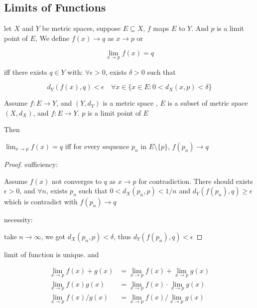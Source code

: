 \subsection{Limits of Functions}

\begin{definition}
    let $X$ and $Y$ be metric spaces, suppose $E \subseteq X$, $f$ maps $E$ to $Y$. 
    And $p$ is a limit point of $E$, We define $f(x) \to q$ as $x \to p$ or

    \[
        \lim_{x \to p}f(x) = q
    \]

    iff there exists $q \in Y$ with: $\forall \epsilon > 0$, exists $\delta > 0$ such that

    \[
        d_Y(f(x), q) < \epsilon \quad \forall x \in  \{x \in E: 0 < d_X(x,p) < \delta \}
    \]
\end{definition}


\begin{thm}
    \label{thm:limit-of-func-iff-limit-of-every-mapping-of-convergent-seq}
    Assume $f: E \to Y$, and $(Y, d_Y)$ is a metric space , $E$ is a subset of metric space $(X, d_X)$, and $f: E\to Y$. 
    $p$ is a limit point of $E$

    Then

    $\lim_{x \to p}f(x) = q$ iff for every sequence $p_n$ in $E \setminus \{p\}$, $f(p_n) \to q$  
\end{thm}

\begin{proof}
   sufficiency: 
   
   Assume $f(x)$ not converges to $q$ as $x \to p$ for contradiction. There should exists $\epsilon > 0$,
    and $\forall n$, exists $p_n$ such that $0 < d_X(p_n, p) < 1/n$ and $d_Y(f(p_n), q) \ge \epsilon$
    which is contradict with $f(p_n) \to q$

    necessity:

    take $n \to \infty$, we got $d_X(p_n, p) < \delta$, thus $d_Y(f(p_n), q) < \epsilon$
\end{proof}

\begin{corollary}
    limit of function is unique. and 

    \begin{align*}
        \lim_{x \to p}f(x) + g(x) &= \lim_{x \to p}f(x) + \lim_{x \to p}g(x) \\
        \lim_{x \to p}f(x) g(x) &= \lim_{x \to p}f(x)  \cdot \lim_{x \to p}g(x) \\
        \lim_{x \to p}f(x)/g(x) &= \lim_{x \to p}f(x)  / \lim_{x \to p}g(x) \\
    \end{align*}
\end{corollary}

